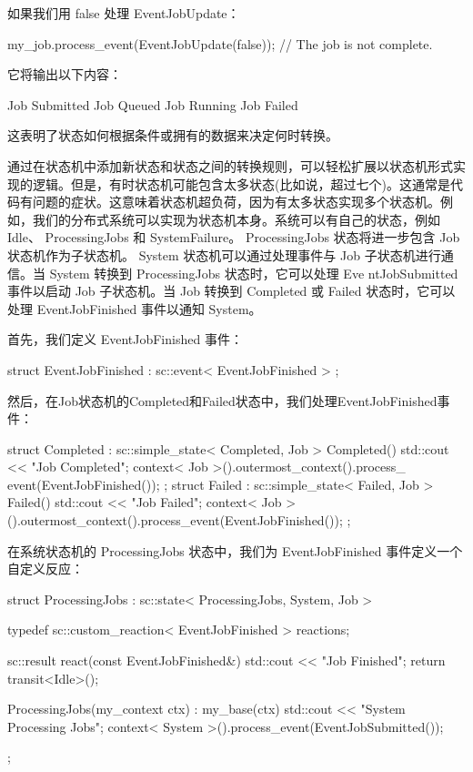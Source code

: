 如果我们用 false 处理 EventJobUpdate：

\begin{cpp}
my_job.process_event(EventJobUpdate(false)); // The job is not complete.
\end{cpp}

它将输出以下内容：

\begin{shell}
Job Submitted
Job Queued
Job Running
Job Failed
\end{shell}

这表明了状态如何根据条件或拥有的数据来决定何时转换。

通过在状态机中添加新状态和状态之间的转换规则，可以轻松扩展以状态机形式实现的逻辑。但是，有时状态机可能包含太多状态(比如说，超过七个)。这通常是代码有问题的症状。这意味着状态机超负荷，因为有太多状态实现多个状态机。例如，我们的分布式系统可以实现为状态机本身。系统可以有自己的状态，例如 Idle、 ProcessingJobs 和 SystemFailure。 ProcessingJobs 状态将进一步包含 Job 状态机作为子状态机。 System 状态机可以通过处理事件与 Job 子状态机进行通信。当 System 转换到 ProcessingJobs 状态时，它可以处理 Eve ntJobSubmitted 事件以启动 Job 子状态机。当 Job 转换到 Completed 或 Failed 状态时，它可以处理 EventJobFinished 事件以通知 System。

首先，我们定义 EventJobFinished 事件：

\begin{cpp}
struct EventJobFinished : sc::event< EventJobFinished > {};
\end{cpp}

然后，在Job状态机的Completed和Failed状态中，我们处理EventJobFinished事件：

\begin{cpp}
struct Completed : sc::simple_state< Completed, Job > {
    Completed() {
        std::cout << "Job Completed\n";
        context< Job >().outermost_context().process_
        event(EventJobFinished());
    }
};
struct Failed : sc::simple_state< Failed, Job > {
    Failed() {
        std::cout << "Job Failed\n";
        context< Job >().outermost_context().process_event(EventJobFinished());
    }
};
\end{cpp}

在系统状态机的 ProcessingJobs 状态中，我们为 EventJobFinished 事件定义一个自定义反应：

\begin{cpp}
struct ProcessingJobs : sc::state< ProcessingJobs, System, Job > {
    typedef sc::custom_reaction< EventJobFinished > reactions;

    sc::result react(const EventJobFinished&) {
        std::cout << "Job Finished\n";
        return transit<Idle>();
    }

    ProcessingJobs(my_context ctx) : my_base(ctx) {
        std::cout << "System Processing Jobs\n";
        context< System >().process_event(EventJobSubmitted());
    }
};
\end{cpp}

